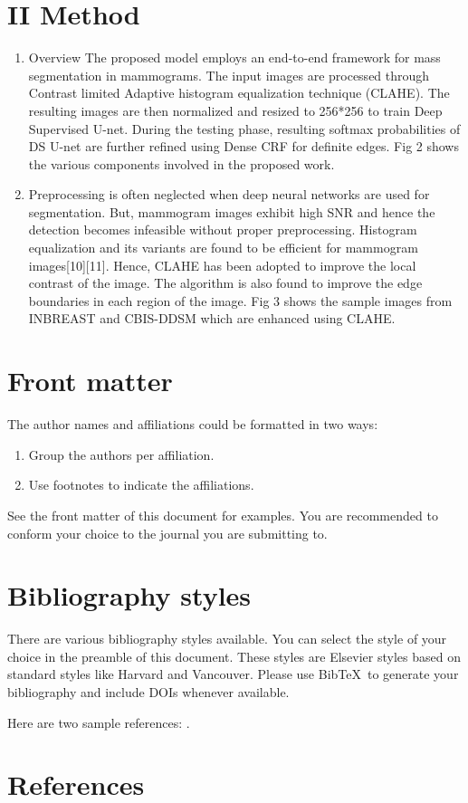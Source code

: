 \documentclass[review]{elsarticle}
\newcommand{\<}{${<}$}
\begin{document}
\section{II Method }
\begin{enumerate}
\item Overview
The proposed model employs an end-to-end framework for mass segmentation in mammograms.  The input images are processed through Contrast limited Adaptive histogram equalization technique (CLAHE).  The resulting images are then normalized and resized to 256*256 to train Deep Supervised U-net. During the testing phase, resulting softmax probabilities of DS U-net are further refined using Dense CRF for  definite edges. Fig 2 shows the various components involved in the proposed work.

\item Preprocessing is often neglected when deep neural networks are used for segmentation. But, mammogram images exhibit high SNR and hence the detection becomes infeasible without proper preprocessing. Histogram equalization and its variants are found to be efficient for mammogram images[10][11]. Hence, CLAHE has been adopted to improve the local contrast of the image. The algorithm is also found to improve the edge boundaries in each region of the image. Fig 3 shows the sample images from INBREAST and CBIS-DDSM which are enhanced using CLAHE.

\end{enumerate}

\section{Front matter}

The author names and affiliations could be formatted in two ways:
\begin{enumerate}[(1)]
\item Group the authors per affiliation.
\item Use footnotes to indicate the affiliations.
\end{enumerate}
See the front matter of this document for examples. You are recommended to conform your choice to the journal you are submitting to.

\section{Bibliography styles}

There are various bibliography styles available. You can select the style of your choice in the preamble of this document. These styles are Elsevier styles based on standard styles like Harvard and Vancouver. Please use Bib\TeX\ to generate your bibliography and include DOIs whenever available.

Here are two sample references: \cite{Feynman1963118,Dirac1953888}.

\section*{References}


\end{document}
